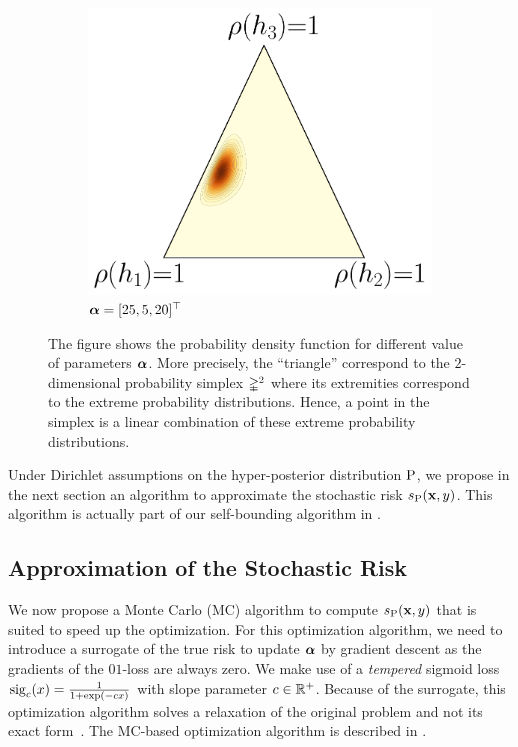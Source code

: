 \begin{figure}
\begin{subfigure}{0.32\textwidth}
    \includegraphics[width=\textwidth]{chapter_5/figures/dirichlet_25_5_20.pdf}
    \caption{$\boldsymbol{\alpha}=[25, 5, 20]^{\top}$}
\end{subfigure}
        
\caption[Examples of Probability Density Functions for the Dirichlet Distribution]{The figure shows the probability density function for different value of parameters $\boldsymbol{\alpha}$. 
More precisely, the ``triangle'' correspond to the $2$-dimensional probability simplex $\mathbb{\Delta}^2$ where its extremities correspond to the extreme probability distributions. 
Hence, a point in the simplex is a linear combination of these extreme probability distributions.
}
\label{chap:mv-sto:fig:dirichlet}
\end{figure}


Under Dirichlet assumptions on the hyper-posterior distribution $\mathrm{P}$, we propose in the next section an algorithm to approximate the stochastic risk $s_{\mathrm{P}}(\mathbf{x},y)$.
This algorithm is actually part of our self-bounding algorithm in .

\subsection{Approximation of the Stochastic Risk}
\label{chap:mv-sto:sec:mc}

We now propose a Monte Carlo (MC) algorithm to compute $s_{\mathrm{P}}(\mathbf{x},y)$ that is suited to speed up the optimization.
For this optimization algorithm, we need to introduce a surrogate of the true risk to update $\boldsymbol{\alpha}$ by gradient descent as the gradients of the $01$-loss are always zero.
We make use of a \emph{tempered} sigmoid loss $\operatorname{sig}_c(x) = \frac{1}{1+\exp(-cx)}$ with slope parameter $c \in \mathbb{R}^{+}$.
Because of the surrogate, this optimization algorithm solves a relaxation of the original problem and not its exact form~\citep{Nesterov2005}.
The MC-based optimization algorithm is described in .

